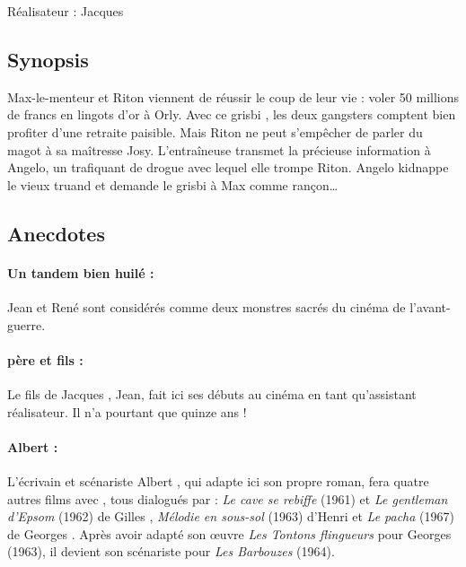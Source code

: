 Réalisateur : Jacques 


\subsection*{Synopsis}

Max-le-menteur et Riton viennent de réussir le coup de leur vie : voler 50
millions de francs en lingots d'or à Orly. Avec ce \og grisbi \fg{}, les deux
gangsters comptent bien profiter d'une retraite paisible. Mais Riton ne peut
s'empêcher de parler du magot à sa maîtresse Josy. L'entraîneuse transmet la
précieuse information à Angelo, un trafiquant de drogue avec lequel elle trompe Riton. Angelo kidnappe le vieux truand et demande le \og grisbi \fg{} à Max comme rançon\dots


\subsection*{Anecdotes}

\paragraph{Un tandem bien huilé :} Jean  et René 
 sont considérés comme deux monstres sacrés du cinéma de
l'avant-guerre.

\paragraph{ père et fils :} Le fils de Jacques 
, Jean, fait ici ses débuts au cinéma en tant qu'assistant
réalisateur. Il n'a pourtant que quinze ans !

\paragraph{Albert  :} L'écrivain et scénariste Albert
, qui adapte ici son propre roman, fera quatre autres films avec , tous dialogués par  : \emph{Le cave se rebiffe} (1961) et \emph{Le gentleman d'Epsom} (1962) de Gilles , \emph{Mélodie en sous-sol} (1963) d'Henri 
 et \emph{Le pacha} (1967) de Georges . Après avoir adapté son \oe uvre \emph{Les Tontons flingueurs} pour Georges  (1963), il devient son scénariste pour \emph{Les Barbouzes}
(1964).


